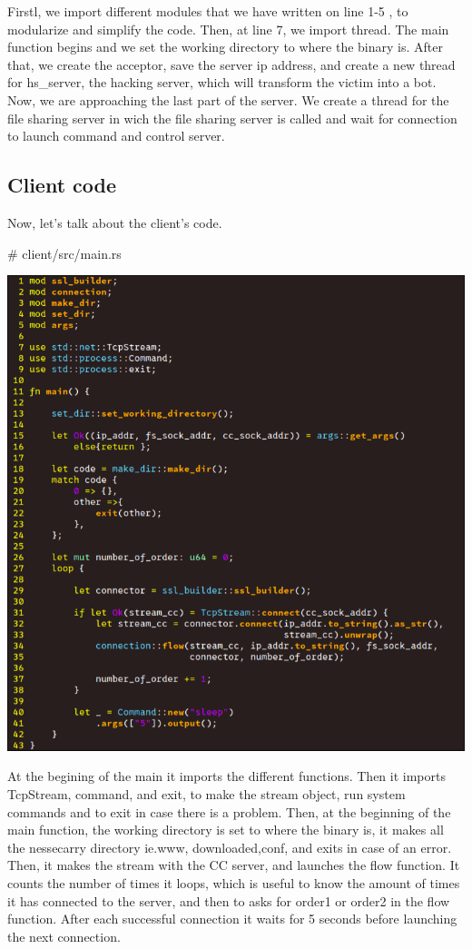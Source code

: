 \documentclass[../main.tex]{subfiles}
\begin{document}
    Firstl, we import different modules that we have written on line 1-5 , to modularize and simplify the code.
    Then, at line 7, we import thread.
    The main function begins and we set the working directory to where the binary is.
    After that, we create the acceptor, save the server ip address, and create a new thread for hs\_server, the hacking server, which will transform the victim into a bot.
    Now, we are approaching the last part of the server.
    We create a thread for the file sharing server in wich the file sharing server is called and wait for connection to launch command and control server.

    
	\vspace{10pt}

	\subsection{Client code}

    Now, let's talk about the client's code.

    \# client/src/main.rs

    \includegraphics[width=450pt]{client_main.png}

    At the begining of the main it imports the different functions.
    Then it imports TcpStream, command, and exit, to make the stream object, run system commands and to exit in case there is a problem.
    Then, at the beginning of the main function, the working directory is set to where the binary is, it makes all the nessecarry directory ie.www, downloaded,conf, and exits in case of an error.
    Then, it makes the stream with the CC server, and launches the flow function. 
    It counts the number of times it loops, which is useful to know the amount of times it has connected to the server, and then to asks for order1 or order2 in the flow function.
    After each successful connection it waits for 5 seconds before launching the next connection.
\end{document}
